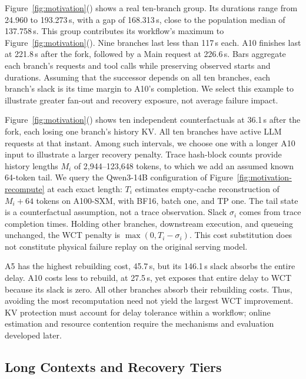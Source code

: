 Figure~\ref{fig:motivation}() shows a
real ten-branch group. Its durations range from 24.960 to 193.273\,s,
with a gap of 168.313\,s, close to the population median of 137.758\,s.
This group contributes its workflow's maximum to
Figure~\ref{fig:motivation}(). Nine branches
last less than 117\,s each. A10 finishes last at 221.8\,s after the fork,
followed by a Main request at 226.6\,s. Bars aggregate each branch's
requests and tool calls while preserving observed starts and durations.
Assuming that the successor depends on all ten branches, each branch's
slack is its time margin to A10's completion. We select this example to
illustrate greater fan-out and recovery exposure, not average failure impact.

Figure~\ref{fig:motivation}() shows
ten independent counterfactuals at 36.1\,s after the fork, each losing
one branch's history KV. All ten branches have active LLM requests at
that instant. Among such intervals, we choose one with a longer A10
input to illustrate a larger recovery penalty. Trace hash-block counts
provide history lengths $M_i$ of 2,944--123,648 tokens, to which we add an
assumed known 64-token tail. We query the Qwen3-14B configuration of
Figure~\ref{fig:motivation-recompute} at each exact length: $T_i$ estimates
empty-cache reconstruction of $M_i+64$ tokens on A100-SXM, with BF16,
batch one, and TP one. The tail state is a counterfactual assumption,
not a trace observation. Slack $\sigma_i$ comes from trace completion
times. Holding other branches, downstream execution, and queueing
unchanged, the WCT penalty is $\max(0,T_i-\sigma_i)$.
This cost substitution does not constitute physical failure replay on
the original serving model.

A5 has the highest rebuilding cost, 45.7\,s, but its 146.1\,s slack
absorbs the entire delay. A10 costs less to rebuild, at 27.5\,s, yet
exposes that entire delay to WCT because its slack is zero. All other
branches absorb their rebuilding costs. Thus, avoiding the most
recomputation need not yield the largest WCT improvement. KV protection
must account for delay tolerance within a workflow; online estimation and
resource contention require the mechanisms and evaluation developed later.

\subsection{Long Contexts and Recovery Tiers}
\label{sec:motivation-long-context}


